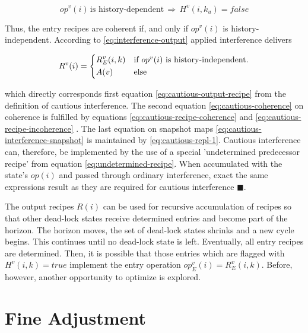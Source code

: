 \documentclass[12pt,a4paper]{scrartcl}
\begin{document}
\begin{equation} \label{eq:cautious-recipe-incoherence}
    op^v(i) \,\mbox{is history-dependent}\,\Rightarrow\,H^v(i, k_u) = false
\end{equation}

Thus, the entry recipes are coherent if, and only if $op^v(i)$ is history-independent.
According to \eqref{eq:interference-output} applied interference delivers

\begin{equation} \label{eq:interference-output-2}
    R^v(i) = \begin{dcases*}
              R_E^v(i,k) & if $op^v(i)$ is history-independent.\\
              A(v)       & else
             \end{dcases*}
\end{equation}

which directly corresponds first equation \eqref{eq:cautious-output-recipe}
from the definition of cautious interference. The second equation
\eqref{eq:cautious-coherence} on coherence is fulfilled by equations
\eqref{eq:cautious-recipe-coherence} and
\eqref{eq:cautious-recipe-incoherence} . The last equation on snapshot maps
\eqref{eq:cautious-interference-snapshot} is maintained by
\eqref{eq:cautious-repl-1}.  Cautious interference can, therefore, be
implemented by the use of a special 'undetermined predecessor recipe' from
equation \eqref{eq:undetermined-recipe}.  When accumulated with the state's
$op(i)$ and passed through ordinary interference, exact the same expressions
result as they are required for cautious interference $\blacksquare$.

The output recipes $R(i)$ can be used for recursive accumulation of recipes so
that other dead-lock states receive determined entries and become part of the
horizon.  The horizon moves, the set of dead-lock states shrinks and a new
cycle begins.  This continues until no dead-lock state is left.  Eventually,
all entry recipes are determined. Then, it is possible that those entries which
are flagged with $H^v(i,k)=true$ implement the entry operation
$op_E^v(i)=R_E^v(i,k)$.  Before, however, another opportunity to optimize is
explored. 

%
\section{Fine Adjustment}
\end{document}
